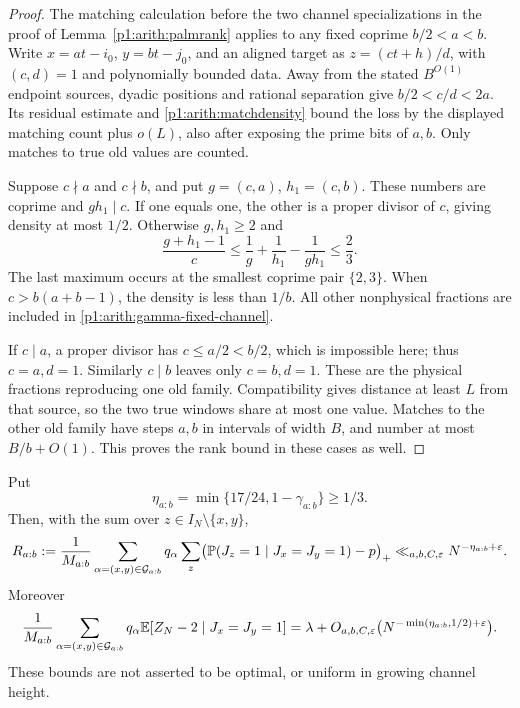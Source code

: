 \begin{proof}
The matching calculation before the two channel specializations in
the proof of Lemma~\ref{p1:arith:palmrank} applies to any fixed coprime
\(b/2<a<b\). Write \(x=at-i_0\), \(y=bt-j_0\), and an aligned target as
\(z=(ct+h)/d\), with \((c,d)=1\) and polynomially bounded data.
Away from the stated \(B^{O(1)}\) endpoint sources, dyadic positions
and rational separation give \(b/2<c/d<2a\).
Its residual estimate and \eqref{p1:arith:matchdensity} bound the loss
by the displayed matching count plus \(o(L)\), also after exposing
the prime bits of \(a,b\). Only matches to true old values are counted.

Suppose \(c\nmid a\) and \(c\nmid b\), and put \(g=(c,a)\), \(h_1=(c,b)\).
These numbers are coprime and \(gh_1\mid c\).
If one equals one, the other is a proper divisor of \(c\), giving
density at most \(1/2\).
Otherwise \(g,h_1\geq2\) and
\[
 \frac{g+h_1-1}{c}
 \leq\frac1g+\frac1{h_1}-\frac1{gh_1}\leq\frac23.
\]
The last maximum occurs at the smallest coprime pair \(\{2,3\}\).
When \(c>b(a+b-1)\), the density is less than \(1/b\).
All other nonphysical fractions are included in
\eqref{p1:arith:gamma-fixed-channel}.

If \(c\mid a\), a proper divisor has \(c\leq a/2<b/2\), which is
impossible here; thus \(c=a,d=1\).
Similarly \(c\mid b\) leaves only \(c=b,d=1\).
These are the physical fractions reproducing one old family.
Compatibility gives distance at least \(L\) from that source, so the
two true windows share at most one value.
Matches to the other old family have steps \(a,b\) in intervals of
width \(B\), and number at most \(B/b+O(1)\).
This proves the rank bound in these cases as well.
\end{proof}

\begin{proposition}
\label{p1:arith:fixed-channel-palm}
Put
\[
 \eta_{a:b}=\min\{17/24,1-\gamma_{a:b}\}\geq1/3.
\]
Then, with the sum over \(z\in I_N\setminus\{x,y\}\),
\[
 R_{a:b}:=
 \frac1{M_{a:b}}\sum_{\alpha=(x,y)\in\mathcal G_{a:b}}q_\alpha
 \sum_z\bigl(\P(J_z=1\mid J_x=J_y=1)-p\bigr)_+
 \ll_{a,b,C,\varepsilon}N^{-\eta_{a:b}+\varepsilon}.
\]
Moreover
\[
 \frac1{M_{a:b}}\sum_{\alpha=(x,y)\in\mathcal G_{a:b}}q_\alpha
 \E[Z_N-2\mid J_x=J_y=1]
 =\lambda+
 O_{a,b,C,\varepsilon}
 \bigl(N^{-\min(\eta_{a:b},1/2)+\varepsilon}\bigr).
\]
These bounds are not asserted to be optimal, or uniform in growing
channel height.
\end{proposition}

